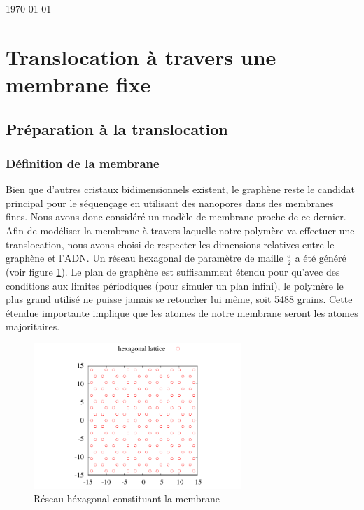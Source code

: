 \documentclass[a4paper,11pt]{article}
\begin{document}
\begin{flushright}
\today
\end{flushright}

\vfill
\hfill 




\setlength{\parindent}{10pt}

\newpage



\section{Translocation à travers une membrane fixe}



\subsection{Préparation à la translocation}

\subsubsection{Définition de la membrane}

Bien que d'autres cristaux bidimensionnels existent, le graphène reste le candidat principal pour le séquençage en utilisant des nanopores dans des membranes fines. Nous avons donc considéré un modèle de membrane proche de ce dernier.
Afin de modéliser la membrane à travers laquelle notre polymère va effectuer une translocation, nous avons choisi de respecter les dimensions relatives  entre le graphène et l'ADN. Un réseau hexagonal de paramètre de maille $\frac{\sigma}{2}$ a été généré (voir figure \ref{reseau}). Le plan de graphène est suffisamment étendu pour qu'avec des conditions aux limites périodiques (pour simuler un plan infini), le polymère le plus grand utilisé ne puisse jamais se retoucher lui même, soit 5488 grains. Cette étendue importante implique que les atomes de notre membrane seront les atomes majoritaires.

\begin{figure}[H]
\begin{center}
\includegraphics[width=0.7\textwidth]{lattice.pdf} 

\caption{Réseau héxagonal constituant la membrane}
\label{reseau}
\end{center}
\end{figure}
\end{document}
